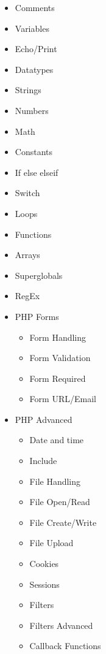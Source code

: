\documentclass[12pt, letterpaper]{article}
\begin{document}
\begin{enumerate}
\begin{itemize}
\begin{enumerate}
\begin{itemize}
                \item Comments
                \item Variables
                \item Echo/Print
                \item Datatypes
                \item Strings
                \item Numbers
                \item Math
                \item Constants
                \item If else elseif
                \item Switch
                \item Loops
                \item Functions
                \item Arrays
                \item Superglobals
                \item RegEx
                \item PHP Forms
                \begin{itemize}
                    \item Form Handling
                    \item Form Validation
                    \item Form Required
                    \item Form URL/Email
                \end{itemize}
                \item PHP Advanced
                \begin{itemize}
                    \item Date and time
                    \item Include
                    \item File Handling
                    \item File Open/Read
                    \item File Create/Write
                    \item File Upload
                    \item Cookies
                    \item Sessions
                    \item Filters
                    \item Filters Advanced
                    \item Callback Functions

\end{itemize}
\end{itemize}
\end{enumerate}
\end{itemize}
\end{enumerate}
\end{document}
